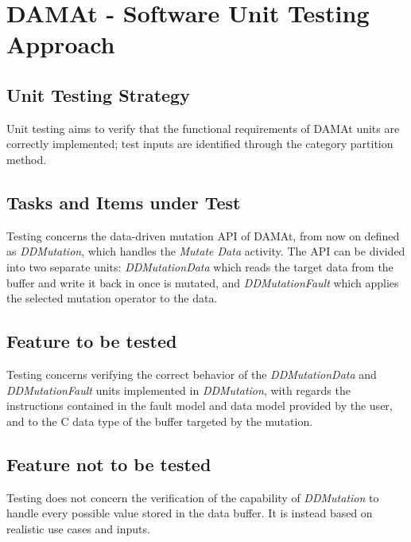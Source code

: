 
\chapter{DAMAt - Software Unit Testing Approach}
\label{chap:approach_DAMAt}


\section{Unit Testing Strategy}

Unit testing aims to verify that the functional requirements of DAMAt units are correctly implemented; test inputs are identified through the category partition method.


\section{Tasks and Items under Test}

Testing concerns the data-driven mutation API of DAMAt, from now on defined as \emph{DDMutation}, which handles the \emph{Mutate Data} activity.
The API can be divided into two separate units: \emph{DDMutationData} which reads the target data from the buffer and write it back in once is mutated, and \emph{DDMutationFault} which applies the selected mutation operator to the data.

\section{Feature to be tested}

Testing concerns verifying the correct behavior of the \emph{DDMutationData} and \emph{DDMutationFault} units implemented in \emph{DDMutation}, with regards the instructions contained in the fault model and data model provided by the user, and to the C data type of the buffer targeted by the mutation.

\section{Feature not to be tested}

Testing does not concern the verification of the capability of \emph{DDMutation} to handle every possible value stored in the data buffer. It is instead based on realistic use cases and inputs.


